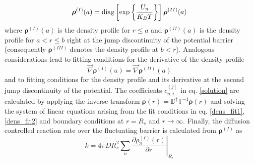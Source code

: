 \documentclass[twocolumn,superscriptaddress]{revtex4}
\newcommand{\vect}[1]{\boldsymbol{\mathbf{#1}}}
\begin{document}
\begin{equation}
    \vect{\rho}^{(I)}(a) = {\rm diag}\left[\exp\left\{\frac{U_n}{K_B T} \right\}\right]\vect{\rho}^{(II)}(a)
    \label{dens_fit1}
\end{equation}
where $\vect{\rho}^{(I)}(a)$ is the density profile for $r \le a$ and $\vect{\rho}^{(II)}(a)$ is the density profile for $ a<r\le b$ right at the jump discontinuity of the potential barrier (consequently $\vect{\rho}^{(III)}$ denotes the density profile at $b<r$). Analogous considerations lead to fitting conditions for the derivative of the density profile
\begin{equation}
    \vec{\nabla}\vect{\rho}^{(I)}(a) =\vec{\nabla}\vect{\rho}^{(II)}(a) 
    \label{dens_fit2}
\end{equation}
and to fitting conditions for the density profile and its derivative at the second jump discontinuity of the potential.
The coefficients $c_{n,i}^{(j)}$ in eq. \eqref{solution} are calculated by applying the inverse transform $\vect{\rho}(r) = \mathbb{D}^{\dagger}\mathbb{T}^{-1}\tilde{\vect{\rho}}(r)$ and solving the system of linear equations arising from the fit conditions in eq. \eqref{dens_fit1}, \eqref{dens_fit2} and boundary conditions at $r=R_s$ and $r \rightarrow \infty$. Finally, the diffusion controlled reaction rate over the fluctuating barrier is calculated from $\vect{\rho}^{(I)}$ as
\begin{equation}
    k = 4 \pi D R_s^{2}\sum_n \left. \frac{\partial \rho_n^{(I)}(r)}{\partial r} \right|_{R_s}
    \label{rate_konstant}
\end{equation}
\end{document}
